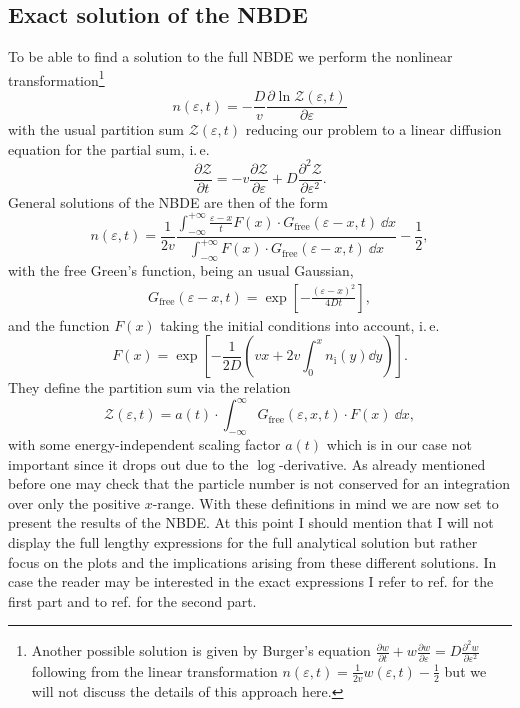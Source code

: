 \subsection{Exact solution of the NBDE}
To be able to find a solution to the full NBDE we perform the nonlinear transformation\footnote{Another possible solution is given by Burger's equation $\frac{\partial w}{\partial t} + w\frac{\partial w}{\partial\varepsilon} = D\frac{\partial^2 w}{\partial\varepsilon^2}$ following from the linear transformation $n(\varepsilon,t) = \frac{1}{2v}w(\varepsilon,t) - \frac{1}{2}$ but we will not discuss the details of this approach here.} 
\begin{equation}
		n(\varepsilon,t) = -\frac{D}{v}\frac{\partial \ln \mathcal{Z}(\varepsilon,t)}{\partial\varepsilon}
\end{equation}
with the usual partition sum $ \mathcal{Z}(\varepsilon,t)$ reducing our problem to a linear diffusion equation for the partial sum, i.\,e.
\begin{equation}
		\frac{\partial  \mathcal{Z}}{\partial t} = -v\frac{\partial  \mathcal{Z}}{\partial \varepsilon} +  D\frac{\partial^2  \mathcal{Z}}{\partial \varepsilon^2}.
	\end{equation}
General solutions of the NBDE are then of the form 	
\begin{equation}
n(\varepsilon, t)=\frac{1}{2 v} \frac{\int_{-\infty}^{+\infty} \frac{\varepsilon-x}{t} F(x)\cdot G_{\mathrm{free}}(\varepsilon-x,t)\ \dd x}{\int_{-\infty}^{+\infty} F(x)\cdot G_{\mathrm{free}}(\varepsilon-x,t)\ \dd x}-\frac{1}{2},
\end{equation}
with the free Green's function, being an usual Gaussian,
\begin{align}
	G_{\mathrm{free}}(\varepsilon-x,t) = \exp\left[-\frac{(\varepsilon-x)^2}{4Dt}\right],
\end{align}
and the function $F(x)$ taking the initial conditions into account, i.\,e.
\begin{equation}
	    F(x)  = \exp\left[-\frac{1}{2D}(vx+2v\int_0^x n_{\mathrm{i}}(y) \dd y) \right].
\end{equation}
They define the partition sum via the relation
\begin{equation}
	\mathcal{Z}(\varepsilon,t) = a(t)\cdot\int_{-\infty}^{\infty} G_{\mathrm{free}}(\varepsilon,x,t)\cdot F(x)\ \dd x,
\end{equation}
with some energy-independent scaling factor $a(t)$ which is in our case not important since it drops out due to the $\operatorname{log}$-derivative. As already mentioned before one may check that the particle number is not conserved for an integration over only the positive $x$-range. With these definitions in mind we are now set to present the results of the NBDE. At this point I should mention that I will not display the full lengthy expressions for the full analytical solution but rather focus on the plots and the implications arising from these different solutions. In case the reader may be interested in the exact expressions I refer to ref. \cite{Wolschin2018} for the first part and to ref. \cite{Wolschin2020_1} for the second part.
